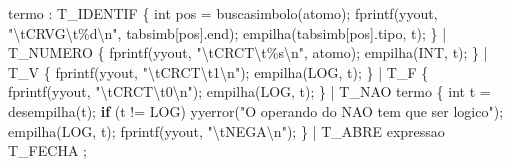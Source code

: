 \documentclass[
  brazilian,
  letterpaper,
]{book}
\newenvironment{Shaded}{\begin{snugshade}}{\end{snugshade}}
\newcommand{\CharTok}[1]{\textcolor[rgb]{0.13,0.47,0.30}{#1}}
\newcommand{\ControlFlowTok}[1]{\textcolor[rgb]{0.00,0.23,0.31}{\textbf{#1}}}
\newcommand{\DataTypeTok}[1]{\textcolor[rgb]{0.68,0.00,0.00}{#1}}
\newcommand{\NormalTok}[1]{\textcolor[rgb]{0.00,0.23,0.31}{#1}}
\newcommand{\OperatorTok}[1]{\textcolor[rgb]{0.37,0.37,0.37}{#1}}
\newcommand{\SpecialCharTok}[1]{\textcolor[rgb]{0.37,0.37,0.37}{#1}}
\newcommand{\StringTok}[1]{\textcolor[rgb]{0.13,0.47,0.30}{#1}}
\theoremstyle{plain}
\theoremstyle{definition}
\theoremstyle{remark}
\begin{document}
\begin{Shaded}
\begin{Highlighting}[]
\NormalTok{termo}
    \OperatorTok{:}\NormalTok{ T\_IDENTIF}
      \OperatorTok{\{} 
        \DataTypeTok{int}\NormalTok{ pos }\OperatorTok{=}\NormalTok{ buscasimbolo}\OperatorTok{(}\NormalTok{atomo}\OperatorTok{);}
\NormalTok{        fprintf}\OperatorTok{(}\NormalTok{yyout}\OperatorTok{,} \StringTok{"}\SpecialCharTok{\textbackslash{}t}\StringTok{CRVG}\SpecialCharTok{\textbackslash{}t\%d\textbackslash{}n}\StringTok{"}\OperatorTok{,}\NormalTok{ tabsimb}\OperatorTok{[}\NormalTok{pos}\OperatorTok{].}\NormalTok{end}\OperatorTok{);}
\NormalTok{        empilha}\OperatorTok{(}\NormalTok{tabsimb}\OperatorTok{[}\NormalTok{pos}\OperatorTok{].}\NormalTok{tipo}\OperatorTok{,} \CharTok{\textquotesingle{}t\textquotesingle{}}\OperatorTok{);} 
      \OperatorTok{\}}
    \OperatorTok{|}\NormalTok{ T\_NUMERO}
      \OperatorTok{\{} 
\NormalTok{        fprintf}\OperatorTok{(}\NormalTok{yyout}\OperatorTok{,} \StringTok{"}\SpecialCharTok{\textbackslash{}t}\StringTok{CRCT}\SpecialCharTok{\textbackslash{}t\%s\textbackslash{}n}\StringTok{"}\OperatorTok{,}\NormalTok{ atomo}\OperatorTok{);}
\NormalTok{        empilha}\OperatorTok{(}\NormalTok{INT}\OperatorTok{,} \CharTok{\textquotesingle{}t\textquotesingle{}}\OperatorTok{);} 
      \OperatorTok{\}}
    \OperatorTok{|}\NormalTok{ T\_V}
      \OperatorTok{\{} 
\NormalTok{        fprintf}\OperatorTok{(}\NormalTok{yyout}\OperatorTok{,} \StringTok{"}\SpecialCharTok{\textbackslash{}t}\StringTok{CRCT}\SpecialCharTok{\textbackslash{}t}\StringTok{1}\SpecialCharTok{\textbackslash{}n}\StringTok{"}\OperatorTok{);}
\NormalTok{        empilha}\OperatorTok{(}\NormalTok{LOG}\OperatorTok{,} \CharTok{\textquotesingle{}t\textquotesingle{}}\OperatorTok{);} 
      \OperatorTok{\}}
    \OperatorTok{|}\NormalTok{ T\_F}
      \OperatorTok{\{} 
\NormalTok{        fprintf}\OperatorTok{(}\NormalTok{yyout}\OperatorTok{,} \StringTok{"}\SpecialCharTok{\textbackslash{}t}\StringTok{CRCT}\SpecialCharTok{\textbackslash{}t}\StringTok{0}\SpecialCharTok{\textbackslash{}n}\StringTok{"}\OperatorTok{);}
\NormalTok{        empilha}\OperatorTok{(}\NormalTok{LOG}\OperatorTok{,} \CharTok{\textquotesingle{}t\textquotesingle{}}\OperatorTok{);} 
      \OperatorTok{\}}
    \OperatorTok{|}\NormalTok{ T\_NAO termo}
      \OperatorTok{\{} 
        \DataTypeTok{int}\NormalTok{ t }\OperatorTok{=}\NormalTok{ desempilha}\OperatorTok{(}\CharTok{\textquotesingle{}t\textquotesingle{}}\OperatorTok{);}
        \ControlFlowTok{if} \OperatorTok{(}\NormalTok{t }\OperatorTok{!=}\NormalTok{ LOG}\OperatorTok{)}
\NormalTok{           yyerror}\OperatorTok{(}\StringTok{"O operando do NAO tem que ser logico"}\OperatorTok{);}
\NormalTok{        empilha}\OperatorTok{(}\NormalTok{LOG}\OperatorTok{,} \CharTok{\textquotesingle{}t\textquotesingle{}}\OperatorTok{);}
\NormalTok{        fprintf}\OperatorTok{(}\NormalTok{yyout}\OperatorTok{,} \StringTok{"}\SpecialCharTok{\textbackslash{}t}\StringTok{NEGA}\SpecialCharTok{\textbackslash{}n}\StringTok{"}\OperatorTok{);} 
      \OperatorTok{\}}
    \OperatorTok{|}\NormalTok{ T\_ABRE expressao T\_FECHA}
    \OperatorTok{;} 


\end{Highlighting}
\end{Shaded}
\end{document}
